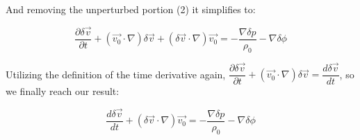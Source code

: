 \documentclass[a4paper]{article}
\begin{document}
\noindent And removing the unperturbed portion (2) it simplifies to:

\begin{equation}
\dfrac{\partial \delta \vec{v}}{\partial t} + (\vec{v_0} \cdot \nabla)\delta \vec{v} + (\delta \vec{v} \cdot \nabla)\vec{v_0} = - \dfrac{\nabla \delta p}{\rho_0} - \nabla \delta \phi
\end{equation}

\noindent Utilizing the definition of the time derivative again, $\dfrac{\partial \delta \vec{v}}{\partial t} + (\vec{v_0} \cdot \nabla)\delta \vec{v} = \dfrac{d \delta \vec{v}}{dt}$, so we finally reach our result:

\begin{equation}
\dfrac{d \delta \vec{v}}{dt} + (\delta \vec{v} \cdot \nabla)\vec{v_0} = - \dfrac{\nabla \delta p}{\rho_0} - \nabla \delta \phi
\end{equation}
\end{document}
